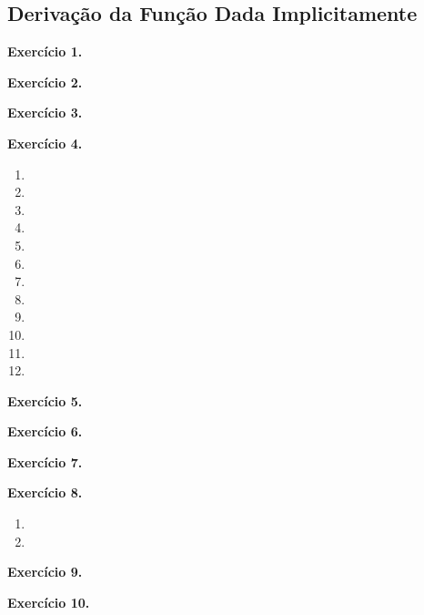 \documentclass[12pt,a4paper]{article}
\begin{document}
\subsection{Derivação da Função Dada Implicitamente}

\vspace{0.5cm}
\noindent\textbf{Exercício 1.}

\vspace{0.5cm}
\noindent\textbf{Exercício 2.}

\vspace{0.5cm}
\noindent\textbf{Exercício 3.}

\vspace{0.5cm}
\noindent\textbf{Exercício 4.}
\begin{enumerate}
    \renewcommand{\theenumi}{\alph{enumi}}
    \renewcommand{\labelenumi}{\theenumi)}
    \item 
    \item 
    \item 
    \item 
    \item 
    \item 
    \item 
    \item 
    \item 
    \item 
    \item 
    \item 
\end{enumerate}

\vspace{0.5cm}
\noindent\textbf{Exercício 5.}

\vspace{0.5cm}
\noindent\textbf{Exercício 6.}

\vspace{0.5cm}
\noindent\textbf{Exercício 7.}

\vspace{0.5cm}
\noindent\textbf{Exercício 8.}
\begin{enumerate}
    \renewcommand{\theenumi}{\alph{enumi}}
    \renewcommand{\labelenumi}{\theenumi)}
    \item 
    \item 
\end{enumerate}

\vspace{0.5cm}
\noindent\textbf{Exercício 9.}

\vspace{0.5cm}
\noindent\textbf{Exercício 10.}
\end{document}
